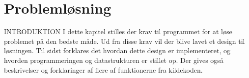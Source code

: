 \chapter{Problemløsning}\label{ch:chlabel}

INTRODUKTION
I dette kapitel stilles der krav til programmet for at løse problemet på den bedste måde. Ud fra disse krav vil der blive lavet et design til løsningen. Til sidst forklares det hvordan dette design er implementeret, og hvorden programmeringen og datastrukturen er stillet op. Der gives også beskrivelser og forklaringer af flere af funktionerne fra kildekoden. 


